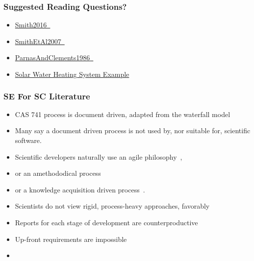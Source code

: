 \documentclass[t,12pt,numbers,fleqn]{beamer}
\begin{document}

\begin{frame}
\frametitle{Suggested Reading Questions?}

\begin {itemize}

\item
  \href{https://gitlab.cas.mcmaster.ca/smiths/cas741/blob/master/ReferenceMaterial/SoftEngForScienceBook.pdf}
  {Smith2016~\cite{Smith2016}}
\item
  \href{https://gitlab.cas.mcmaster.ca/smiths/cas741/blob/master/ReferenceMaterial/SmithLaiAndKhedri2007fulltext.pdf}
  {SmithEtAl2007~\cite{SmithEtAl2007}}
\item
  \href{https://gitlab.cas.mcmaster.ca/smiths/cas741/blob/master/ReferenceMaterial/ParnasAndClements1986.pdf}
  {{ParnasAndClements1986}~\cite{ParnasAndClements1986}}
\item \href{https://github.com/smiths/swhs}{Solar Water Heating System Example}

\end{itemize}

\end{frame}


\begin{frame}
\frametitle{SE For SC Literature}

\begin {itemize}

\item CAS 741 process is document driven, adapted
from the waterfall model~\cite{GhezziEtAl2003, VanVliet2000}
\item Many say a document driven process is not used by, nor suitable for,
scientific software.
\bi
\item Scientific developers naturally use an agile
  philosophy~\cite{AckroydEtAl2008, CarverEtAl2007, EasterbrookAndJohns2009, Segal2005}, 
\item or an amethododical process~\cite{Kelly2013}
\item or a knowledge acquisition driven process~\cite{Kelly2015}.
\ei
\item Scientists do not view rigid, process-heavy approaches,
  favorably~\cite{CarverEtAl2007}
\item Reports for each stage of development are counterproductive~\cite[p.~373]{Roache1998}
\item Up-front requirements are
impossible~\cite{CarverEtAl2007, SegalAndMorris2008}
\item {}
\end{itemize}

\end{frame}
\end{document}
